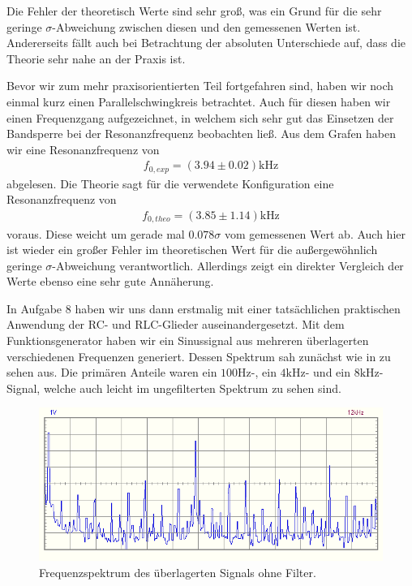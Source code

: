 Die Fehler der theoretisch Werte sind sehr groß, was ein Grund für die sehr geringe $\sigma$-Abweichung zwischen diesen und den gemessenen Werten ist. Andererseits fällt auch bei Betrachtung der absoluten Unterschiede auf, dass die Theorie sehr nahe an der Praxis ist.

Bevor wir zum mehr praxisorientierten Teil fortgefahren sind, haben wir noch einmal kurz einen Parallelschwingkreis betrachtet. Auch für diesen haben wir einen Frequenzgang aufgezeichnet, in welchem sich sehr gut das Einsetzen der Bandsperre bei der Resonanzfrequenz beobachten ließ. Aus dem Grafen haben wir eine Resonanzfrequenz von 
\begin{align*}
  f_{0,exp} = (3.94 \pm 0.02)\si{\kilo\hertz}
\end{align*}
abgelesen. Die Theorie sagt für die verwendete Konfiguration eine Resonanzfrequenz von 
\begin{align*}
  f_{0,theo} = (3.85 \pm 1.14)\si{\kilo\hertz}
\end{align*}
voraus. Diese weicht um gerade mal $0.078\sigma$ vom gemessenen Wert ab. Auch hier ist wieder ein großer Fehler im theoretischen Wert für die außergewöhnlich geringe $\sigma$-Abweichung verantwortlich. Allerdings zeigt ein direkter Vergleich der Werte ebenso eine sehr gute Annäherung.

In Aufgabe 8 haben wir uns dann erstmalig mit einer tatsächlichen praktischen Anwendung der RC- und RLC-Glieder auseinandergesetzt. Mit dem Funktionsgenerator haben wir ein Sinussignal aus mehreren überlagerten verschiedenen Frequenzen generiert. Dessen Spektrum sah zunächst wie in  zu sehen aus. Die primären Anteile waren ein $100\si{\hertz}$-, ein $4\si{\kilo\hertz}$- und ein $8\si{\kilo\hertz}$-Signal, welche auch leicht im ungefilterten Spektrum zu sehen sind.

\begin{figure}[H]
  \centering
  \includegraphics[width=.8\textwidth]{files/aufgabe8_teil1_spectrum.png}
  \caption{Frequenzspektrum des überlagerten Signals ohne Filter.}
  \label{fig:zmfs_aufgabe8_teil1_osz}
\end{figure}

